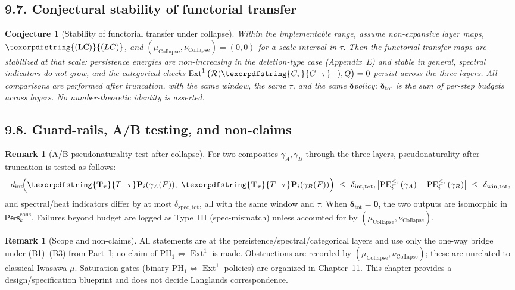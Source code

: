 \documentclass[11pt]{article}
\DeclareMathOperator{\Ext}{Ext}
\DeclareRobustCommand{\hyp}{\nobreakdash-}
\newcommand{\Pers}{\mathsf{Pers}}
\newcommand{\Rfun}{\mathcal{R}}
\numberwithin{equation}{section}
\newtheorem{conjecture}{Conjecture}[section]
\theoremstyle{definition}
\newtheorem{remark}[theorem]{Remark}
\DeclareRobustCommand{\Perskft}{\Pers^{\mathrm{cons}}_{k}}
\DeclareRobustCommand{\Ttau}{\texorpdfstring{\ensuremath{\mathbf{T}_{\tau}}}{T\_\tau}}
\DeclareRobustCommand{\Ctau}{\texorpdfstring{\ensuremath{C_{\tau}}}{C\_\tau}}
\DeclareRobustCommand{\muc}{\mu_{\mathrm{Collapse}}}
\DeclareRobustCommand{\nuc}{\nu_{\mathrm{Collapse}}}
\DeclareRobustCommand{\LC}{\texorpdfstring{\ensuremath{\mathrm{(LC)}}}{(LC)}}
\providecommand{\n}{\unskip\space}
\begin{document}
\subsection*{9.7. Conjectural stability of functorial transfer}
\begin{conjecture}[Stability of functorial transfer under collapse]\label{conj:9-stability}
Within the implementable range, assume non\hyp expansive layer maps, \(\LC\), and \((\muc,\nuc)=(0,0)\) for a scale interval in \(\tau\).
Then the functorial transfer maps are stabilized at that scale: persistence energies are non\hyp increasing in the deletion\hyp type case (Appendix~E) and stable in general, spectral indicators do not grow, and the categorical checks \(\Ext^1\big(\Rfun(\Ctau -),Q\big)=0\) persist across the three layers.
All comparisons are performed after truncation, with the same window, the same \(\tau\), and the same \(\boldsymbol{\delta}\)\nobreakdash policy; \(\boldsymbol{\delta}_{\mathrm{tot}}\) is the sum of per\hyp step budgets across layers.
No number\hyp theoretic identity is asserted.
\end{conjecture}

\subsection*{9.8. Guard\hyp rails, A/B testing, and non\hyp claims}
\begin{remark}[A/B pseudonaturality test after collapse]\label{rk:9-AB}
For two composites \(\gamma_A,\gamma_B\) through the three layers,
pseudonaturality after truncation is tested as follows:
\[
d_{\mathrm{int}}\!\Big(\Ttau\mathbf{P}_i(\gamma_A(F)),\ \Ttau\mathbf{P}_i(\gamma_B(F))\Big)\ \le\ \delta_{\mathrm{int,tot}},\quad\n\big|\mathrm{PE}_i^{\le\tau}(\gamma_A)-\mathrm{PE}_i^{\le\tau}(\gamma_B)\big|\ \le\ \delta_{\mathrm{win,tot}},
\]
and spectral/heat indicators differ by at most \(\delta_{\mathrm{spec,tot}}\), all with the same window and \(\tau\).
When \(\boldsymbol{\delta}_{\mathrm{tot}}=\mathbf{0}\), the two outputs are isomorphic in \(\Perskft\).
Failures beyond budget are logged as Type~III (spec\hyp mismatch) unless accounted for by \((\muc,\nuc)\).
\end{remark}

\begin{remark}[Scope and non\hyp claims]\label{rk:9-guard}
All statements are at the persistence/spectral/categorical layers and use only the one\hyp way bridge under (B1)–(B3) from Part~I; no claim of \(\mathrm{PH}_1\Leftrightarrow\Ext^1\) is made.
Obstructions are recorded by \((\muc,\nuc)\); these are unrelated to classical Iwasawa \(\mu\).
Saturation gates (binary \(\mathrm{PH}_1\)\(\Leftrightarrow\)\(\Ext^1\) policies) are organized in Chapter~11.
This chapter provides a design/specification blueprint and does not decide Langlands correspondence.
\end{remark}
\end{document}
